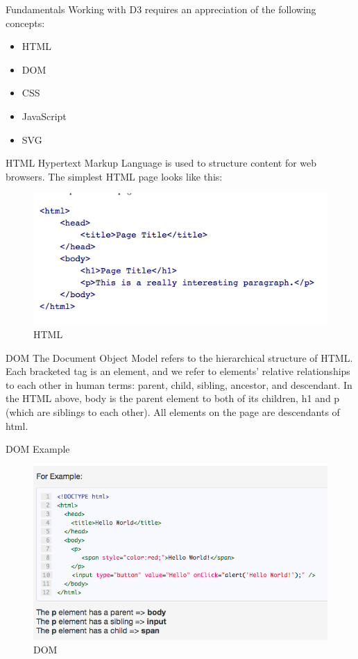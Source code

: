 \documentclass{beamer}
\begin{document}
\begin{frame}{Fundamentals} 
Working with D3 requires an appreciation of the following concepts:

\begin{itemize}
	\item HTML 
	\item DOM
	\item CSS
	\item JavaScript
	\item SVG
\end{itemize}
\end{frame}

\begin{frame}{HTML}
Hypertext Markup Language is used to structure content for web browsers. The simplest HTML page looks like this:
\begin{figure}
\centering
\includegraphics[width=1.0\textwidth]{./images/HTML.png}
\caption{\label{fig:samplemax} HTML}
\end{figure}
\end{frame}

\begin{frame}{DOM}
The Document Object Model refers to the hierarchical structure of HTML. Each bracketed tag is an element, and we refer to elements' relative relationships to each other in human terms: parent, child, sibling, ancestor, and descendant. In the HTML above, body is the parent element to both of its children, h1 and p (which are siblings to each other). All elements on the page are descendants of html.
\end{frame}

\begin{frame}{DOM Example} 
\begin{figure}
\centering
\includegraphics[width=1.0\textwidth]{./images/DOM.png}
\caption{\label{fig:DOM} DOM}
\end{figure}
\end{frame}
\end{document}
